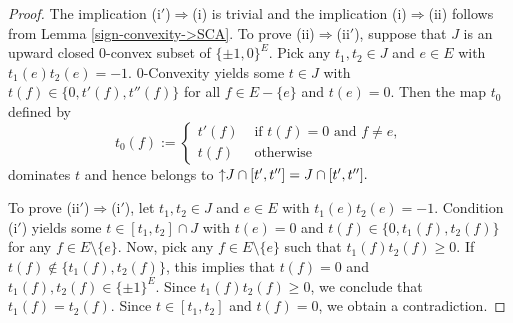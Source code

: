 \documentclass[11pt,a4paper]{amsart}
\theoremstyle{definition}
\numberwithin{equation}{section}
\newcommand{\hcovectors}{J}
\begin{document}
\begin{proof} The implication  {\rm(i$'$)}$\Rightarrow${\rm(i)} is  trivial and the implication {\rm(i)}$\Rightarrow${\rm(ii)}  follows from Lemma \ref{sign-convexity->SCA}. To prove  {\rm(ii)}$\Rightarrow${\rm(ii$'$)}, suppose that $\hcovectors$ is an upward closed 0-convex subset of $\{ \pm 1, 0\}^E$. Pick any $t_1,t_2\in \hcovectors$ and $e\in E$ with $t_1(e)t_2(e)=-1$.
$0$-Convexity yields some $t\in \hcovectors$ with $t(f)\in \{ 0,t'(f),t''(f)\}$ for all $f\in E-\{ e\}$ and $t(e)=0.$ Then the map $t_0$ defined by
$$
t_0(f):=\begin{cases}
t'(f) &\mbox{ if } t(f)=0 \mbox{ and } f\ne e,\\
t(f) &\mbox{ otherwise }
\end{cases}
$$
dominates $t$ and hence belongs to $\uparrow\hspace*{-0.1cm}\hcovectors\cap [t',t'']=\hcovectors\cap [t',t''].$

To prove  {\rm(ii$'$)}$\Rightarrow${\rm(i$'$)}, let $t_1,t_2\in \hcovectors$ and $e\in E$ with $t_1(e)t_2(e)=-1$.  Condition {\rm(i$'$)} yields some $t\in [t_1,t_2]\cap \hcovectors$ with $t(e)=0$ and $t(f)\in \{ 0, t_1(f),t_2(f)\}$ for any $f\in E\setminus \{ e\}$. Now, pick any $f\in E\setminus \{ e\}$ such that $t_1(f)t_2(f)\ge 0$. If $t(f)\notin \{ t_1(f),t_2(f)\}$, this implies that $t(f)=0$ and $t_1(f),t_2(f)\in \{ \pm 1\}^E$. Since $t_1(f)t_2(f)\ge 0$, we conclude that $t_1(f)=t_2(f)$. Since $t\in [t_1,t_2]$ and $t(f)=0$, we obtain a contradiction.


\end{proof}
\end{document}
